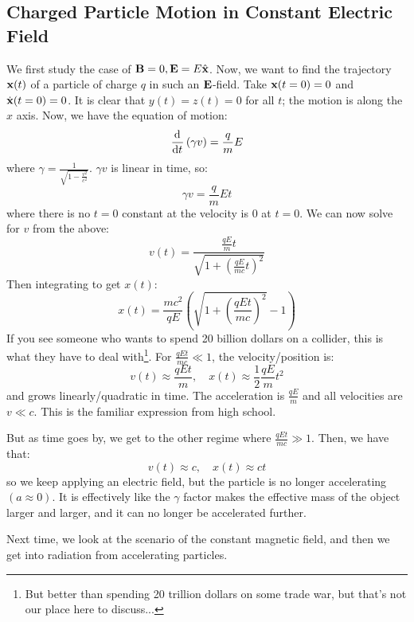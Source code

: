 \subsection{Charged Particle Motion in Constant Electric Field}
We first study the case of $\mathbf{B} = 0, \mathbf{E} = E\hat{\mathbf{x}}$. Now, we want to find the trajectory $\mathbf{x}(t)$ of a particle of charge $q$ in such an $\mathbf{E}$-field. Take $\mathbf{x}(t=0) = 0$ and $\dot{\mathbf{x}}(t=0) = 0$. It is clear that $y(t) = z(t) = 0$ for all $t$; the motion is along the $x$ axis. Now, we have the equation of motion:
\begin{equation}
    \dod{}{t}(\gamma v) = \frac{q}{m}E
\end{equation}
where $\gamma = \frac{1}{\sqrt{1-\frac{v^2}{c^2}}}$. $\gamma v$ is linear in time, so:
\begin{equation}
    \gamma v = \frac{q}{m}Et 
\end{equation}
where there is no $t = 0$ constant at the velocity is 0 at $t=0$. We can now solve for $v$ from the above:
\begin{equation}
    v(t) = \frac{\frac{qE}{m}t}{\sqrt{1 + \left(\frac{qE}{mc}t\right)^2}}
\end{equation}
Then integrating to get $x(t)$:
\begin{equation}
    x(t) = \frac{mc^2}{qE}\left(\sqrt{1 + \left(\frac{qEt}{mc}\right)^2} - 1\right)
\end{equation}
If you see someone who wants to spend 20 billion dollars on a collider, this is what they have to deal with\footnote{But better than spending 20 trillion dollars on some trade war, but that's not our place here to discuss...}. For $\frac{qEt}{mc} \ll 1$, the velocity/position is:
\begin{equation}
    v(t) \approx \frac{qEt}{m}, \quad x(t) \approx \frac{1}{2}\frac{qE}{m}t^2
\end{equation}
and grows linearly/quadratic in time. The acceleration is $\frac{qE}{m}$ and all velocities are $v \ll c$. This is the familiar expression from high school.

But as time goes by, we get to the other regime where $\frac{qEt}{mc} \gg 1$. Then, we have that:
\begin{equation}
    v(t) \approx c,\quad  x(t) \approx ct
\end{equation}
so we keep applying an electric field, but the particle is no longer accelerating $(a \approx 0)$. It is effectively like the $\gamma$ factor makes the effective mass of the object larger and larger, and it can no longer be accelerated further.

Next time, we look at the scenario of the constant magnetic field, and then we get into radiation from accelerating particles.